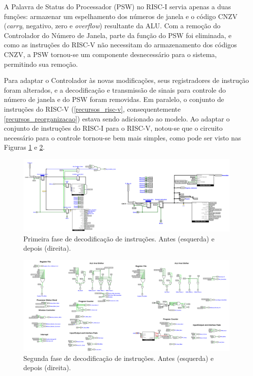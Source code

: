 \documentclass[
	12pt,				%
	openright,			%
	oneside,			%
	a4paper,			%
	english,			%
	french,				%
	spanish,			%
	brazil,				%
	]{abntex2}
\begin{document}
A Palavra de Status do Processador (PSW) no RISC-I servia apenas a duas funções: armazenar um espelhamento dos números de janela e o código CNZV (\textit{carry}, negativo, zero e \textit{overflow}) resultante da ALU. Com a remoção do Controlador do Número de Janela, parte da função do PSW foi eliminada, e como as instruções do RISC-V não necessitam do armazenamento dos códigos CNZV, a PSW tornou-se um componente desnecessário para o sistema, permitindo sua remoção.

Para adaptar o Controlador às novas modificações, seus registradores de instrução foram alterados, e a decodificação e transmissão de sinais para controle do número de janela e do PSW foram removidas. Em paralelo, o conjunto de instruções do RISC-V (\ref{recursos_risc-v}, consequentemente \ref{recursos_reorganizacao}) estava sendo adicionado ao modelo. Ao adaptar o conjunto de instruções do RISC-I para o RISC-V, notou-se que o circuito necessário para o controle tornou-se bem mais simples, como pode ser visto nas Figuras \ref{fig:Controlador_1_1} e \ref{fig:Controlador_1_2}.

\begin{figure}[h]
    \centering
    \includegraphics[width=1\linewidth]{ProcessoDesenvolvimento/Arquitetura/Controlador_1_1.png}
    \caption{Primeira fase de decodificação de instruções. Antes (esquerda) e depois (direita).}
    \label{fig:Controlador_1_1}
\end{figure}

\begin{figure}[h]
    \centering
    \includegraphics[width=1\linewidth]{ProcessoDesenvolvimento/Arquitetura/Controlador_1_2.png}
    \caption{Segunda fase de decodificação de instruções. Antes (esquerda) e depois (direita).}
    \label{fig:Controlador_1_2}
\end{figure}
\end{document}
